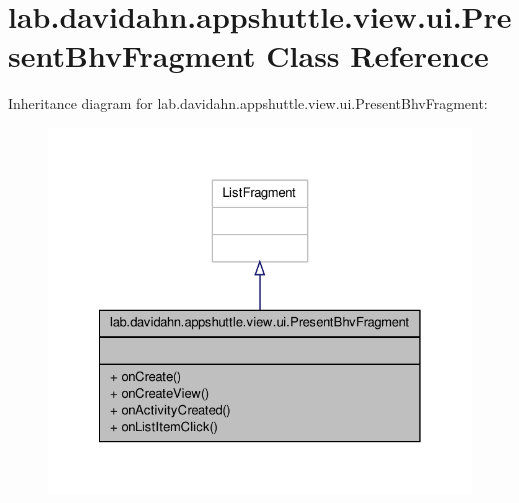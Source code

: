 \hypertarget{classlab_1_1davidahn_1_1appshuttle_1_1view_1_1ui_1_1_present_bhv_fragment}{\section{lab.\-davidahn.\-appshuttle.\-view.\-ui.\-Present\-Bhv\-Fragment \-Class \-Reference}
\label{classlab_1_1davidahn_1_1appshuttle_1_1view_1_1ui_1_1_present_bhv_fragment}
}


\-Inheritance diagram for lab.\-davidahn.\-appshuttle.\-view.\-ui.\-Present\-Bhv\-Fragment\-:
\nopagebreak
\begin{figure}[H]
\begin{center}
\leavevmode
\includegraphics[width=328pt]{classlab_1_1davidahn_1_1appshuttle_1_1view_1_1ui_1_1_present_bhv_fragment__inherit__graph}
\end{center}
\end{figure}


